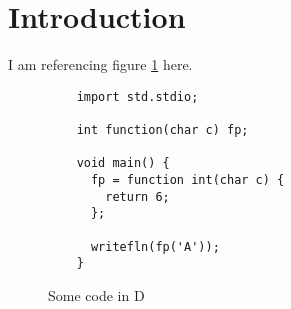 \section{Introduction} \label{sec:introduction}

I am referencing figure \ref{fig:some_code_in_D} here.

\begin{figure}
  \caption{Some code in D}
  \label{fig:some_code_in_D}
  \begin{lstlisting}
    import std.stdio;

    int function(char c) fp;

    void main() {
      fp = function int(char c) {
        return 6;
      };

      writefln(fp('A'));
    }
  \end{lstlisting}
\end{figure}
